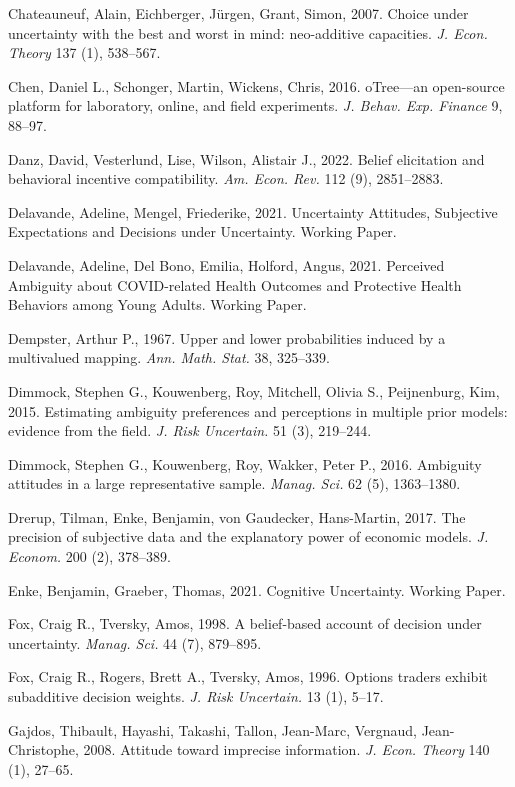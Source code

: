 \documentclass[12pt,a4paper]{article}
\newenvironment{original}
  {\par\medskip\noindent\color{black}\ignorespaces}
  {\par\medskip}
\begin{document}
\begin{original}
\noindent Chateauneuf, Alain, Eichberger, J\"{u}rgen, Grant, Simon, 2007. Choice under uncertainty with the best and worst in mind: neo-additive capacities. \textit{J. Econ. Theory} 137 (1), 538--567.

\noindent Chen, Daniel L., Schonger, Martin, Wickens, Chris, 2016. oTree---an open-source platform for laboratory, online, and field experiments. \textit{J. Behav. Exp. Finance} 9, 88--97.

\noindent Danz, David, Vesterlund, Lise, Wilson, Alistair J., 2022. Belief elicitation and behavioral incentive compatibility. \textit{Am. Econ. Rev.} 112 (9), 2851--2883.

\noindent Delavande, Adeline, Mengel, Friederike, 2021. Uncertainty Attitudes, Subjective Expectations and Decisions under Uncertainty. Working Paper.

\noindent Delavande, Adeline, Del Bono, Emilia, Holford, Angus, 2021. Perceived Ambiguity about COVID-related Health Outcomes and Protective Health Behaviors among Young Adults. Working Paper.

\noindent Dempster, Arthur P., 1967. Upper and lower probabilities induced by a multivalued mapping. \textit{Ann. Math. Stat.} 38, 325--339.

\noindent Dimmock, Stephen G., Kouwenberg, Roy, Mitchell, Olivia S., Peijnenburg, Kim, 2015. Estimating ambiguity preferences and perceptions in multiple prior models: evidence from the field. \textit{J. Risk Uncertain.} 51 (3), 219--244.

\noindent Dimmock, Stephen G., Kouwenberg, Roy, Wakker, Peter P., 2016. Ambiguity attitudes in a large representative sample. \textit{Manag. Sci.} 62 (5), 1363--1380.

\noindent Drerup, Tilman, Enke, Benjamin, von Gaudecker, Hans-Martin, 2017. The precision of subjective data and the explanatory power of economic models. \textit{J. Econom.} 200 (2), 378--389.

\noindent Enke, Benjamin, Graeber, Thomas, 2021. Cognitive Uncertainty. Working Paper.

\noindent Fox, Craig R., Tversky, Amos, 1998. A belief-based account of decision under uncertainty. \textit{Manag. Sci.} 44 (7), 879--895.

\noindent Fox, Craig R., Rogers, Brett A., Tversky, Amos, 1996. Options traders exhibit subadditive decision weights. \textit{J. Risk Uncertain.} 13 (1), 5--17.

\noindent Gajdos, Thibault, Hayashi, Takashi, Tallon, Jean-Marc, Vergnaud, Jean-Christophe, 2008. Attitude toward imprecise information. \textit{J. Econ. Theory} 140 (1), 27--65.


\end{original}
\end{document}
